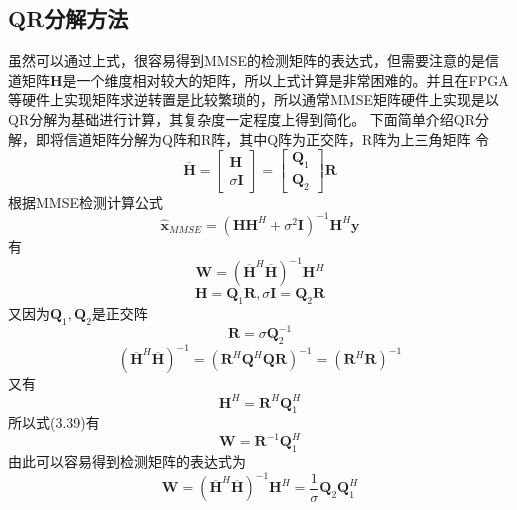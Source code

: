 \documentclass[bachelor,nocolorlinks, printoneside]{seuthesis} %
\begin{document}
\begin{Main}
\section{QR分解方法}
虽然可以通过上式，很容易得到MMSE的检测矩阵的表达式，但需要注意的是信道矩阵$\mathbf{H}$是一个维度相对较大的矩阵，所以上式计算是非常困难的。并且在FPGA等硬件上实现矩阵求逆转置是比较繁琐的，所以通常MMSE矩阵硬件上实现是以QR分解为基础进行计算，其复杂度一定程度上得到简化。
下面简单介绍QR分解，即将信道矩阵分解为Q阵和R阵，其中Q阵为正交阵，R阵为上三角矩阵
令
\begin{equation}\label{key}
\overline{\mathbf{H}} = \left[
\begin{array}{c}
\mathbf{H}\\
\sigma \mathbf{I}
\end{array} \right] =
\left[
\begin{array}{c}
\mathbf{Q}_1\\
\mathbf{Q}_2
\end{array} \right] \mathbf{R}
\end{equation}
根据MMSE检测计算公式
\begin{equation}\label{key}
\hat{\mathbf{x}}_{MMSE} = (\mathbf{H}\mathbf{H}^H + \sigma^2 \mathbf{I})^{-1}\mathbf{H}^H \mathbf{y}
\end{equation}
有
\begin{equation}\label{key}
\mathbf{W}=(\overline{\mathbf{H}}^H \overline{\mathbf{H}})^{-1} \mathbf{H}^H
\end{equation}
\begin{equation}\label{key}
\mathbf{H} = \mathbf{Q}_1 \mathbf{R} ,\sigma\mathbf{I} = \mathbf{Q}_2\mathbf{R}
\end{equation}
又因为$\mathbf{Q}_1,\mathbf{Q}_2$是正交阵
\begin{equation}\label{key}
\mathbf{R} = \sigma \mathbf{Q}_2^{-1}
\end{equation}
\begin{equation}\label{key}
(\overline{\mathbf{H}}^H \overline{\mathbf{H}})^{-1} = (\mathbf{R}^H \mathbf{Q}^H\mathbf{Q} \mathbf{R})^{-1} =(\mathbf{R}^H \mathbf{R})^{-1}
\end{equation}
又有
\begin{equation}\label{key}
\mathbf{H}^{H} =\mathbf{R}^{H} \mathbf{Q}_1^H 
\end{equation}
所以式(3.39)有
\begin{equation}\label{key}
\mathbf{W} = \mathbf{R}^{-1} \mathbf{Q}_1^H
\end{equation}
由此可以容易得到检测矩阵的表达式为
\begin{equation}\label{key}
\mathbf{W}=(\overline{\mathbf{H}}^H \overline{\mathbf{H}})^{-1} \mathbf{H}^H = \frac{1}{\sigma} \mathbf{Q}_2 \mathbf{Q}_1^H
\end{equation}


\end{Main}
\end{document}
